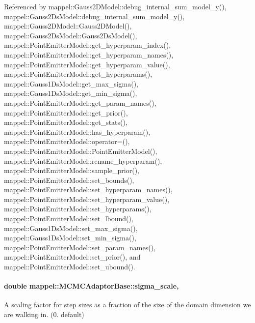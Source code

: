 Referenced by mappel\+::\+Gauss2\+D\+Model\+::debug\+\_\+internal\+\_\+sum\+\_\+model\+\_\+y(), mappel\+::\+Gauss2\+Ds\+Model\+::debug\+\_\+internal\+\_\+sum\+\_\+model\+\_\+y(), mappel\+::\+Gauss2\+D\+Model\+::\+Gauss2\+D\+Model(), mappel\+::\+Gauss2\+Ds\+Model\+::\+Gauss2\+Ds\+Model(), mappel\+::\+Point\+Emitter\+Model\+::get\+\_\+hyperparam\+\_\+index(), mappel\+::\+Point\+Emitter\+Model\+::get\+\_\+hyperparam\+\_\+names(), mappel\+::\+Point\+Emitter\+Model\+::get\+\_\+hyperparam\+\_\+value(), mappel\+::\+Point\+Emitter\+Model\+::get\+\_\+hyperparams(), mappel\+::\+Gauss1\+Ds\+Model\+::get\+\_\+max\+\_\+sigma(), mappel\+::\+Gauss1\+Ds\+Model\+::get\+\_\+min\+\_\+sigma(), mappel\+::\+Point\+Emitter\+Model\+::get\+\_\+param\+\_\+names(), mappel\+::\+Point\+Emitter\+Model\+::get\+\_\+prior(), mappel\+::\+Point\+Emitter\+Model\+::get\+\_\+stats(), mappel\+::\+Point\+Emitter\+Model\+::has\+\_\+hyperparam(), mappel\+::\+Point\+Emitter\+Model\+::operator=(), mappel\+::\+Point\+Emitter\+Model\+::\+Point\+Emitter\+Model(), mappel\+::\+Point\+Emitter\+Model\+::rename\+\_\+hyperparam(), mappel\+::\+Point\+Emitter\+Model\+::sample\+\_\+prior(), mappel\+::\+Point\+Emitter\+Model\+::set\+\_\+bounds(), mappel\+::\+Point\+Emitter\+Model\+::set\+\_\+hyperparam\+\_\+names(), mappel\+::\+Point\+Emitter\+Model\+::set\+\_\+hyperparam\+\_\+value(), mappel\+::\+Point\+Emitter\+Model\+::set\+\_\+hyperparams(), mappel\+::\+Point\+Emitter\+Model\+::set\+\_\+lbound(), mappel\+::\+Gauss1\+Ds\+Model\+::set\+\_\+max\+\_\+sigma(), mappel\+::\+Gauss1\+Ds\+Model\+::set\+\_\+min\+\_\+sigma(), mappel\+::\+Point\+Emitter\+Model\+::set\+\_\+param\+\_\+names(), mappel\+::\+Point\+Emitter\+Model\+::set\+\_\+prior(), and mappel\+::\+Point\+Emitter\+Model\+::set\+\_\+ubound().

\paragraph[{\texorpdfstring{sigma\+\_\+scale}{sigma_scale}}]{\setlength{\rightskip}{0pt plus 5cm}double mappel\+::\+M\+C\+M\+C\+Adaptor\+Base\+::sigma\+\_\+scale\hspace{0.3cm}{\ttfamily [protected]}, {\ttfamily [inherited]}}\hypertarget{classmappel_1_1MCMCAdaptorBase_a76312f7d589bf3f3e754beca174b884b}{}\label{classmappel_1_1MCMCAdaptorBase_a76312f7d589bf3f3e754beca174b884b}
A scaling factor for step sizes as a fraction of the size of the domain dimension we are walking in. (0. default) 

